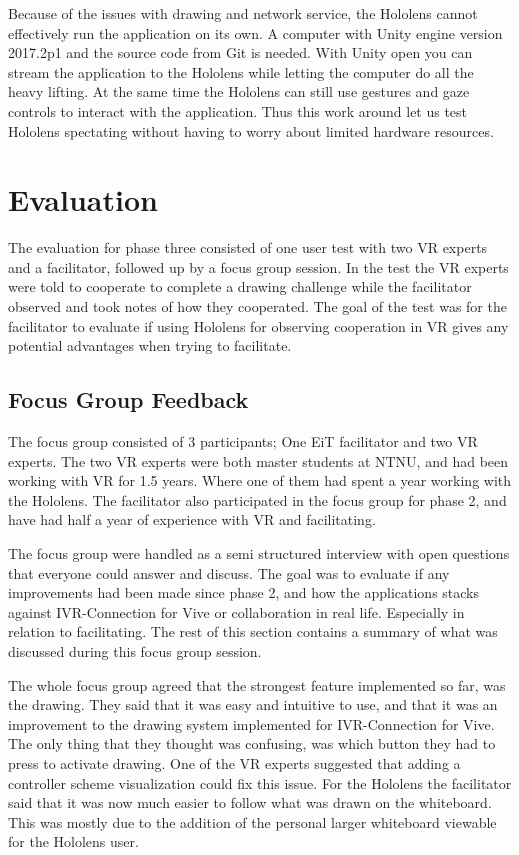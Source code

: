         Because of the issues with drawing and network service, the Hololens cannot effectively run the application on its own. A computer with Unity engine version 2017.2p1 and the source code from Git is needed. With Unity open you can stream the application to the Hololens while letting the computer do all the heavy lifting. At the same time the Hololens can still use gestures and gaze controls to interact with the application. Thus this work around let us test Hololens spectating without having to worry about limited hardware resources.
    
    \section{Evaluation} %
    The evaluation for phase three consisted of one user test with two VR experts and a facilitator, followed up by a focus group session. In the test the VR experts were told to cooperate to complete a drawing challenge while the facilitator observed and took notes of how they cooperated. The goal of the test was for the facilitator to evaluate if using Hololens for observing cooperation in VR gives any potential advantages when trying to facilitate.
        
        \subsection{Focus Group Feedback}
        The focus group consisted of 3 participants; One EiT facilitator and two VR experts. The two VR experts were both master students at NTNU, and had been working with VR for 1.5 years. Where one of them had spent a year working with the Hololens. The facilitator also participated in the focus group for phase 2, and have had half a year of experience with VR and facilitating.
        
        The focus group were handled as a semi structured interview with open questions that everyone could answer and discuss. The goal was to evaluate if any improvements had been made since phase 2, and how the applications stacks against IVR-Connection for Vive or collaboration in real life. Especially in relation to facilitating. The rest of this section contains a summary of what was discussed during this focus group session.
        
        The whole focus group agreed that the strongest feature implemented so far, was the drawing. They said that it was easy and intuitive to use, and that it was an improvement to the drawing system implemented for IVR-Connection for Vive. The only thing that they thought was confusing, was which button they had to press to activate drawing. One of the VR experts suggested that adding a controller scheme visualization could fix this issue. For the Hololens the facilitator said that it was now much easier to follow what was drawn on the whiteboard. This was mostly due to the addition of the personal larger whiteboard viewable for the Hololens user.
        
